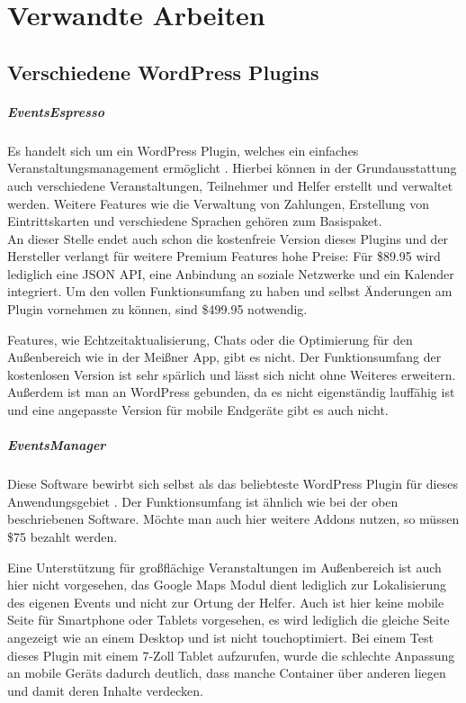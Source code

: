 \chapter{Verwandte Arbeiten}

\section{Verschiedene WordPress Plugins}
\paragraph{EventsEspresso}
Es handelt sich um ein WordPress Plugin, welches ein einfaches Veranstaltungsmanagement ermöglicht \cite{eventespresso}. Hierbei können in der Grundausstattung auch verschiedene Veranstaltungen, Teilnehmer und Helfer erstellt und verwaltet werden. Weitere Features wie die Verwaltung von Zahlungen, Erstellung von Eintrittskarten und verschiedene Sprachen gehören zum Basispaket.\\
An dieser Stelle endet auch schon die kostenfreie Version dieses Plugins und der Hersteller verlangt für weitere Premium Features hohe Preise: Für \$89.95 wird lediglich eine JSON API, eine Anbindung an soziale Netzwerke und ein Kalender integriert. Um den vollen Funktionsumfang zu haben und selbst Änderungen am Plugin vornehmen zu können, sind \$499.95 notwendig.\par

Features, wie Echtzeitaktualisierung, Chats oder die Optimierung für den Außenbereich wie in der Meißner App, gibt es nicht. Der Funktionsumfang der kostenlosen Version ist sehr spärlich und lässt sich nicht ohne Weiteres erweitern. Außerdem ist man an WordPress gebunden, da es nicht eigenständig lauffähig ist und eine angepasste Version für mobile Endgeräte gibt es auch nicht.

\paragraph{EventsManager}
Diese Software bewirbt sich selbst als das beliebteste WordPress Plugin für dieses Anwendungsgebiet \cite{eventsmanager}. Der Funktionsumfang ist ähnlich wie bei der oben beschriebenen Software. Möchte man auch hier weitere Addons nutzen, so müssen \$75 bezahlt werden.\par

Eine Unterstützung für großflächige Veranstaltungen im Außenbereich ist auch hier nicht vorgesehen, das Google Maps Modul dient lediglich zur Lokalisierung des eigenen Events und nicht zur Ortung der Helfer. Auch ist hier keine mobile Seite für Smartphone oder Tablets vorgesehen, es wird lediglich die gleiche Seite angezeigt wie an einem Desktop und ist nicht touchoptimiert. Bei einem Test dieses Plugin mit einem 7-Zoll Tablet aufzurufen, wurde die schlechte Anpassung an mobile Geräts dadurch deutlich, dass manche Container über anderen liegen und damit deren Inhalte verdecken.

